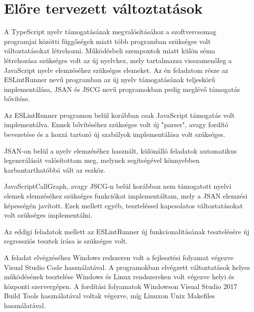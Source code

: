 \chapter{Előre tervezett változtatások}
\label{chap:fejezet3}

A TypeScript nyelv támogatásának megvalósításához a szoftvercsomag programjai közötti függőségek miatt több programban szükséges volt változtatásokat létrehozni.
Működésbeli szempontok miatt külön séma létrehozása szükséges volt az új nyelvhez, mely tartalmazza visszamenőleg a JavaScript nyelv elemzéséhez szükséges elemeket.
Az én feladatom része az ESLintRunner nevű programban az új nyelv támogatásának teljeskörű implementálása, JSAN és JSCG nevű programokban pedig meglévő támogatás bővítése.

Az ESLintRunner programon belül korábban csak JavaScript támogatás volt implementálva. Ennek bővítéséhez szükséges volt új "parser", avagy fordító bevezetése és a hozzá tartozó új szabályok implementálása volt szükséges.

JSAN-on belül a nyelv elemzéséhez használt, különálló feladatok automatikus legenerálását valósítottam meg, melynek segítségével könnyebben karbantarthatóbbá vált az eszköz.

JavaScriptCallGraph, avagy JSCG-n belül korábban nem támogatott nyelvi elemek elemzéséhez szükséges funkciókat implementáltam, mely a JSAN elemzési képességén javított.
Ezek mellett egyéb, teszteléssel kapcsolatos változtatásokat volt szükséges implementálni.

Az eddigi feladatok mellett az ESLintRunner új funkcionalitásának tesztelésére új regressziós tesztek írása is szükséges volt.

A feladat elvégzéséhez Windows redszeren volt a fejlesztési folyamat végezve Visual Studio Code használatával. A programokban elvégzett változtatások helyes működésének tesztelése Windows és Linux rendszereken volt végezve helyi és központi szervergépen. A fordítási folyamatok Windowson Visual Studio 2017 Build Tools használatával voltak végezve, míg Linuxon Unix Makefiles használatával.
